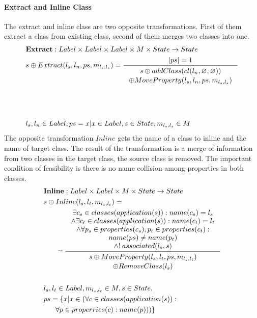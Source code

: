\documentclass[11pt]{article}
\begin{document}
\paragraph{Extract and Inline Class}
The extract and inline class are two opposite transformations. First of them extract a class from existing class, second of them merges two classes into one.
\begin{align*}
&	\mathbf{Extract} : Label \times Label \times Label \times M \times State \rightarrow State \\
&	s \oplus Extract(l_s, l_n, ps, m_{l_s, l_s}) = %
	\inference{|ps| = 1}{\begin{gathered}
		s \oplus addClass(cl(l_n, \varnothing, \varnothing)) \\ \oplus MoveProperty(l_s, l_n, ps, m_{l_s, l_s}) \end{gathered}}\\\\
\\\\
&	l_s, l_n \in Label, ps ={ x | x  \in Label},  s \in State, m_{l_s, l_s} \in M
\end{align*}
The opposite transformation $Inline$ gets the name of a class to inline and the name of target class. The result of the transformation is a merge of information from two classes in the target class, the source class is removed. The important condition of feasibility is there is no name collision among properties in both classes.
\begin{align*}
&	\mathbf{Inline} : Label \times Label \times M \times State \rightarrow State \\
&	s \oplus Inline(l_s, l_t, m_{l_s, l_t}) = \\
& \;\;\;\;\;\; =\inference{\exists c_s \in classes(application(s)) : name(c_s) = l_s \\
\wedge \exists c_t \in classes(application(s)) : name(c_t) = l_t \\
\wedge \forall p_s \in properties(c_s), p_t \in properties(c_t) :\\  name(ps) \neq name(p_t) \\
\wedge !\:associated(l_s, s)   }{\begin{gathered}
	s \oplus MoveProperty(l_s, l_t, ps, m_{l_s, l_t}) \\ \oplus RemoveClass(l_s) 
\end{gathered}
}\\\\
& l_s, l_t \in Label, m_{l_s, l_t} \in M, s \in State, \\ 
& ps = \{x | x \in (\forall c \in classes(application(s)) : \\ 
& \;\;\;\;\;\; \forall p \in properries(c) : name(p)))\}
\end{align*}
\end{document}
